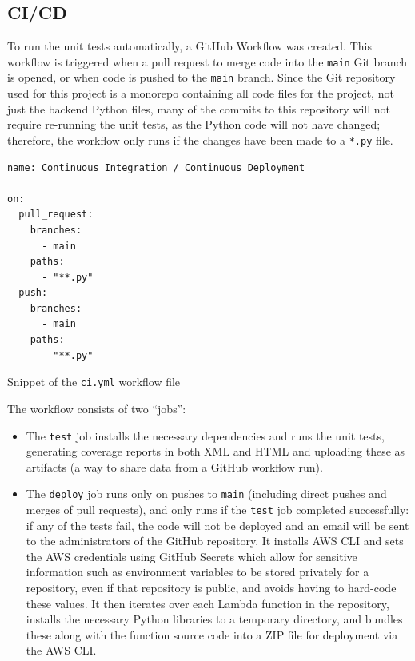 \documentclass[a4paper,11pt]{report}
\newenvironment{code}{\captionsetup{type=listing}}{}
\begin{document}
\subsection{CI/CD}
To run the unit tests automatically, a GitHub Workflow\supercite{workflow} was created.
This workflow is triggered when a pull request to merge code into the \verb|main| Git branch is opened, or when code is pushed to the \verb|main| branch.
Since the Git repository used for this project is a monorepo containing all code files for the project, not just the backend Python files, many of the commits to this repository will not require re-running the unit tests, as the Python code will not have changed;
therefore, the workflow only runs if the changes have been made to a \verb|*.py| file.

\begin{code}
\begin{verbatim}
name: Continuous Integration / Continuous Deployment

on:
  pull_request:
    branches:
      - main
    paths:
      - "**.py"
  push:
    branches:
      - main
    paths:
      - "**.py"
\end{verbatim}
\caption{Snippet of the \texttt{ci.yml} workflow file}
\end{code}

The workflow consists of two ``jobs'':
\begin{itemize}
    \item   The \verb|test| job installs the necessary dependencies and runs the unit tests, generating coverage reports in both XML and HTML and uploading these as artifacts\supercite{artifacts} (a way to share data from a GitHub workflow run).
    \item   The \verb|deploy| job runs only on pushes to \verb|main| (including direct pushes and merges of pull requests), and only runs if the \verb|test| job completed successfully: if any of the tests fail, the code will not be deployed and an email will be sent to the administrators of the GitHub repository.
            It installs AWS CLI\supercite{aws_cli} and sets the AWS credentials using GitHub Secrets\supercite{githubsecrets} which allow for sensitive information such as environment variables to be stored privately for a repository, even if that repository is public, and avoids having to hard-code these values.
            It then iterates over each Lambda function in the repository, installs the necessary Python libraries to a temporary directory, and bundles these along with the function source code into a ZIP file for deployment via the AWS CLI. 
\end{itemize}
\end{document}
